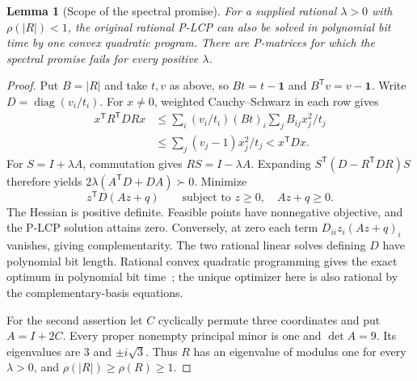 \documentclass[11pt,oneside,openany,notitlepage]{report}
\newtheorem{lemma}[theorem]{Lemma}
\begin{document}
\begin{lemma}[Scope of the spectral promise]\label{lem:cayley-qp}
For a supplied rational \(\lambda>0\) with \(\rho(|R|)<1\), the
original rational P-LCP can also be solved in polynomial bit time by
one convex quadratic program. There are P-matrices for which the
spectral promise fails for every positive \(\lambda\).
\end{lemma}
\begin{proof}
Put \(B=|R|\) and take \(t,v\) as above, so \(Bt=t-\mathbf1\) and
\(B^{\mathsf T}v=v-\mathbf1\). Write \(D=\operatorname{diag}(v_i/t_i)\).
For \(x\ne0\), weighted Cauchy--Schwarz in each row gives
\[
\begin{aligned}
 x^{\mathsf T}R^{\mathsf T}DRx
 &\le \sum_i (v_i/t_i)(Bt)_i\sum_j B_{ij}x_j^2/t_j\\
 &\le \sum_j (v_j-1)x_j^2/t_j < x^{\mathsf T}Dx .
\end{aligned}
\]
For \(S=I+\lambda A\), commutation gives \(RS=I-\lambda A\).
Expanding \(S^{\mathsf T}(D-R^{\mathsf T}DR)S\) therefore yields
\(2\lambda(A^{\mathsf T}D+DA)\succ0\). Minimize
\[
 z^{\mathsf T}D(Az+q)\qquad\text{subject to }z\ge0,\quad Az+q\ge0 .
\]
The Hessian is positive definite. Feasible points have nonnegative
objective, and the P-LCP solution attains zero. Conversely, at zero
each term \(D_{ii}z_i(Az+q)_i\) vanishes, giving complementarity.
The two rational linear solves defining \(D\) have polynomial bit
length. Rational convex quadratic programming gives the exact optimum
in polynomial bit time~\cite{ktk}; the unique optimizer here is also
rational by the complementary-basis equations.

For the second assertion let \(C\) cyclically permute three coordinates
and put \(A=I+2C\). Every proper nonempty principal minor is one and
\(\det A=9\). Its eigenvalues are \(3\) and \(\pm i\sqrt3\). Thus \(R\)
has an eigenvalue of modulus one for every \(\lambda>0\), and
\(\rho(|R|)\ge\rho(R)\ge1\).
\end{proof}
\end{document}
